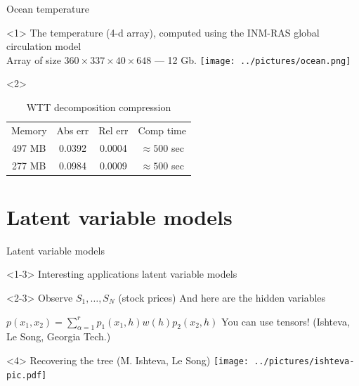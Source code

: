 \documentclass{beamer}[14pt, presentation]
\begin{document}
\begin{frame}[label=sec-8-2]{Ocean temperature}
\begin{onlyenv}<1>
The temperature (4-d array), computed using the INM-RAS global
circulation model \\
Array of size $360 \times 337 \times 40 \times 648$ --- 12 Gb.
\texttt{[image: ../pictures/ocean.png]}
\end{onlyenv}

\begin{onlyenv}<2>
\begin{table}[H]
\begin{small}
 \begin{center}
  \begin{tabular}{cccc}
   Memory & Abs err & Rel err & Comp time\\
   497 MB & 0.0392 & 0.0004 & $\approx 500$ sec \\
   277 MB & 0.0984  & 0.0009 & $\approx 500$ sec \\
  \end{tabular}
 \caption{WTT decomposition compression}
 \end{center}
\end{small}
\end{table}
\end{onlyenv}
\end{frame}
\section{Latent variable models}
\label{sec-9}
\begin{frame}[label=sec-9-1]{Latent variable models}
\begin{onlyenv}<1-3>
Interesting applications
 \vskip 2mm 
 \alert{latent variable models}
\end{onlyenv}

\begin{onlyenv}<2-3>
Observe $S_1,\ldots,S_N$ (stock prices) 
\vskip 2mm
And here are the hidden variables
\end{onlyenv}

\begin{onlyenv}
$p(x_1,x_2) = \sum_{\alpha=1}^r p_1(x_1,h) w(h) p_2(x_2,h)$
\vskip 2mm 
 You can use tensors! (Ishteva, Le Song, Georgia Tech.)
\end{onlyenv}

\begin{onlyenv}<4>
Recovering the tree
\vskip 3mm
(M. Ishteva, Le Song)
\texttt{[image: ../pictures/ishteva-pic.pdf]}
\end{onlyenv}
\end{frame}
\end{document}
